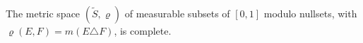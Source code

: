 The metric space $(\tilde{S}, \varrho)$ of measurable subsets of $[0,1]$ modulo nullsets, with $\varrho(E,F) = m(E \triangle F)$, is complete.

